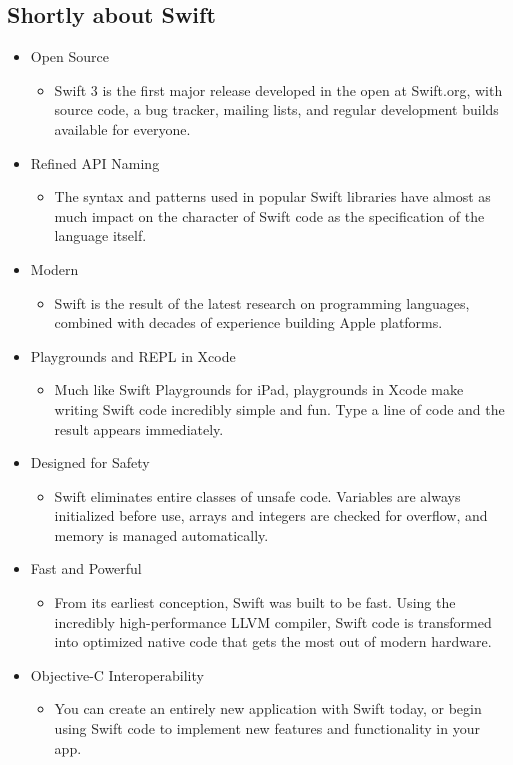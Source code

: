 \documentclass[12pt,a4paper]{article}
\begin{document}
{{	\subsection{Shortly about Swift}
	\label{shortlyaboutswift}
\begin{itemize}
	\item Open Source
	\begin{itemize}
	\item Swift 3 is the first major release developed in the open at Swift.org, with source code, a bug tracker, mailing lists, and regular development builds available for everyone.
	\end{itemize}
	\item Refined API Naming
	\begin{itemize}
	\item The syntax and patterns used in popular Swift libraries have almost as much impact on the character of Swift code as the specification of the language itself.
	\end{itemize}
	\item Modern
	\begin{itemize}
	\item Swift is the result of the latest research on programming languages, combined with decades of experience building Apple platforms.
	\end{itemize}
	\item Playgrounds and REPL in Xcode
	\begin{itemize}
	\item Much like Swift Playgrounds for iPad, playgrounds in Xcode make writing Swift code incredibly simple and fun. Type a line of code and the result appears immediately.
	\end{itemize}
	\item Designed for Safety
	\begin{itemize}
	\item Swift eliminates entire classes of unsafe code. Variables are always initialized before use, arrays and integers are checked for overflow, and memory is managed automatically. 
	\end{itemize}
	\item Fast and Powerful
	\begin{itemize}
	\item From its earliest conception, Swift was built to be fast. Using the incredibly high-performance LLVM compiler, Swift code is transformed into optimized native code that gets the most out of modern hardware.
	\end{itemize}
	\item Objective-C Interoperability
	\begin{itemize}
	\item You can create an entirely new application with Swift today, or begin using Swift code to implement new features and functionality in your app.
	\end{itemize}
\end{itemize}
	\newpage
}}
\end{document}
